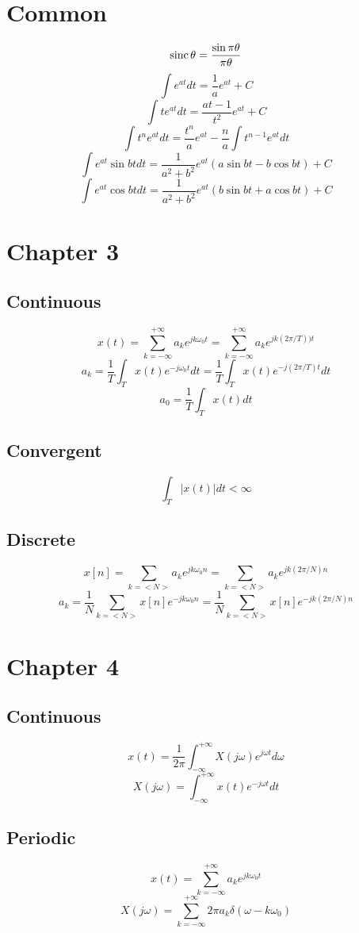\documentclass[landscape,a4paper]{article}
\begin{document}
\begin{multicols}{3}
\footnotesize

\section*{Common}
$${\rm sinc\,}\theta=\frac{\sin\pi\theta}{\pi\theta}$$
$$\int e^{at}dt=\frac{1}{a}e^{at}+C$$
$$\int te^{at}dt=\frac{at-1}{t^2}e^{at}+C$$
$$\int t^ne^{at}dt=\frac{t^n}{a}e^{at}-\frac{n}{a}\int t^{n-1}e^{at}dt$$
$$\int e^{at}\sin btdt=\frac{1}{a^2+b^2}e^{at}(a\sin bt-b\cos bt)+C$$
$$\int e^{at}\cos btdt=\frac{1}{a^2+b^2}e^{at}(b\sin bt+a\cos bt)+C$$


\section*{Chapter 3}
\subsection*{Continuous}
$$x(t)=\sum_{k=-\infty}^{+\infty}a_ke^{jk\omega_0t}=\sum_{k=-\infty}^{+\infty}a_ke^{jk(2\pi/T))t}$$
$$a_k=\frac{1}{T}\int_Tx(t)e^{-j\omega_0t}dt=\frac{1}{T}\int_Tx(t)e^{-j(2\pi/T)t}dt$$
$$a_0=\frac{1}{T}\int_Tx(t)dt$$

\subsection*{Convergent}
$$\int_T|x(t)|dt<\infty$$

\subsection*{Discrete}
$$x[n]=\sum_{k=<N>}a_ke^{jk\omega_0n}=\sum_{k=<N>}a_ke^{jk(2\pi/N)n}$$
$$a_k=\frac{1}{N}\sum_{k=<N>}x[n]e^{-jk\omega_0n}=\frac{1}{N}\sum_{k=<N>}x[n]e^{-jk(2\pi/N)n}$$

\section*{Chapter 4}

\subsection*{Continuous}
$$x(t)=\frac{1}{2\pi}\int_{-\infty}^{+\infty}X(j\omega)e^{j\omega t}d\omega$$
$$X(j\omega)=\int_{-\infty}^{+\infty}x(t)e^{-j\omega t}dt$$

\subsection*{Periodic}
$$x(t)=\sum_{k=-\infty}^{+\infty}a_ke^{jk\omega_0t}$$
$$X(j\omega)=\sum_{k=-\infty}^{+\infty}2\pi a_k\delta(\omega-k\omega_0)$$


\end{multicols}
\end{document}
